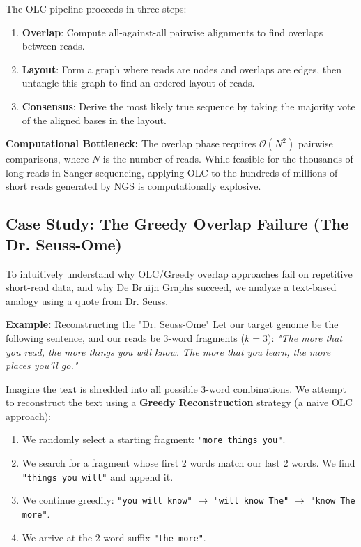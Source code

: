 The OLC pipeline proceeds in three steps:
\begin{enumerate}
    \item \textbf{Overlap}: Compute all-against-all pairwise alignments to find overlaps between reads.
    \item \textbf{Layout}: Form a graph where reads are nodes and overlaps are edges, then untangle this graph to find an ordered layout of reads.
    \item \textbf{Consensus}: Derive the most likely true sequence by taking the majority vote of the aligned bases in the layout.
\end{enumerate}

\sta \textbf{Computational Bottleneck:} The overlap phase requires $\mathcal{O}(N^2)$ pairwise comparisons, where $N$ is the number of reads. While feasible for the thousands of long reads in Sanger sequencing, applying OLC to the hundreds of millions of short reads generated by NGS is computationally explosive.

\subsection{Case Study: The Greedy Overlap Failure (The Dr. Seuss-Ome)}
To intuitively understand why OLC/Greedy overlap approaches fail on repetitive short-read data, and why De Bruijn Graphs succeed, we analyze a text-based analogy using a quote from Dr. Seuss.

\textbf{Example:} Reconstructing the "Dr. Seuss-Ome"
Let our target genome be the following sentence, and our reads be 3-word fragments ($k=3$):
\textit{"The more that you read, the more things you will know. The more that you learn, the more places you'll go."}

Imagine the text is shredded into all possible 3-word combinations. We attempt to reconstruct the text using a \textbf{Greedy Reconstruction} strategy (a naive OLC approach):
\begin{enumerate}
    \item We randomly select a starting fragment: \texttt{"more things you"}.
    \item We search for a fragment whose first 2 words match our last 2 words. We find \texttt{"things you will"} and append it.
    \item We continue greedily: \texttt{"you will know"} $\rightarrow$ \texttt{"will know The"} $\rightarrow$ \texttt{"know The more"}.
    \item We arrive at the 2-word suffix \texttt{"the more"}. 
\end{enumerate}

